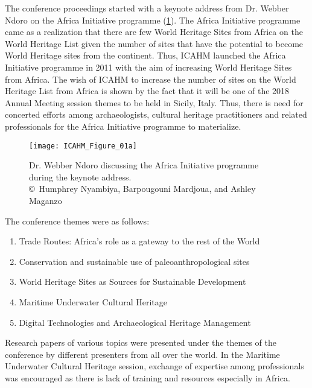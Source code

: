 The conference proceedings started with a keynote address from Dr. Webber Ndoro on the Africa Initiative programme (\cref{fig:ICAHM_Figure_01a}).  The Africa Initiative programme came as a realization that there are few World Heritage Sites from Africa on the World Heritage List given the number of sites that have the potential to become World Heritage sites from the continent. Thus, ICAHM launched the Africa Initiative programme in 2011 with the aim of increasing World Heritage Sites from Africa. The wish of ICAHM to increase the number of sites on the World Heritage List from Africa is shown by the fact that it will be one of the 2018 Annual Meeting session themes to be held in Sicily, Italy. Thus, there is need for concerted efforts among archaeologists, cultural heritage practitioners and related professionals for the Africa Initiative programme to materialize.

\begin{figure}[!tb]
	\texttt{[image: ICAHM\_Figure\_01a]}
	\caption{Dr. Webber Ndoro discussing the Africa Initiative programme during the keynote address.
		{\normalfont\scriptsize \\ \copyright\
			Humphrey Nyambiya, Barpougouni Mardjoua, and Ashley Maganzo %
	}}
	\label{fig:ICAHM_Figure_01a}
\end{figure}

The conference themes were as follows:
\begin{enumerate}
	\item Trade Routes: Africa’s role as a gateway to the rest of the World
	\item Conservation and sustainable use of paleoanthropological sites
	\item World Heritage Sites as Sources for Sustainable Development
	\item Maritime Underwater Cultural Heritage
	\item Digital Technologies and Archaeological Heritage Management
\end{enumerate}

Research papers of various topics were presented under the themes of the conference by different presenters from all over the world. In the Maritime Underwater Cultural Heritage session, exchange of expertise among professionals was encouraged as there is lack of training and resources especially in Africa.


